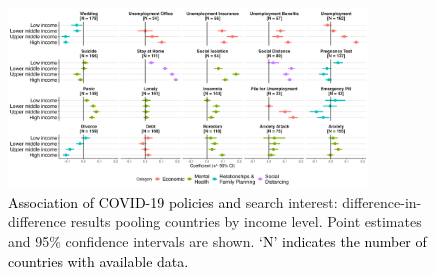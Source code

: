 \documentclass{article}
\begin{document}
\begin{figure}[t]
    \centering
    \includegraphics[width=0.85\textwidth]{figures/did_income_90.png}
    \caption{\textcolor{black}{Association of COVID-19 policies and} search interest: difference-in-difference results pooling countries by income level. Point estimates and 95\% confidence intervals are shown. \textcolor{black}{`N' indicates the number of countries with available data.}}
    \label{fig:did_income_90}
\end{figure}
\end{document}

